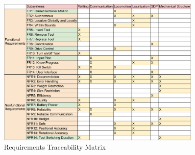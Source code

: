 \begin{figure}[h!]
\centering
\includegraphics[width=0.9\textwidth]{figs/requirements_matrix.pdf}
\caption{Requirements Traceability Matrix}
\label{fig:req_matrix}
\end{figure}

\clearpage
